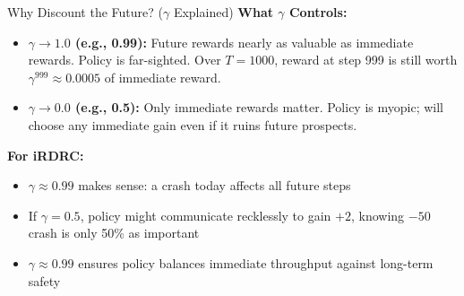 \documentclass{beamer}
\begin{document}
\begin{frame}{Why Discount the Future? ($\gamma$ Explained)}
  \textbf{What $\gamma$ Controls:}

  \begin{itemize}
    \item \textbf{$\gamma \to 1.0$ (e.g., 0.99):} Future rewards nearly as valuable as immediate rewards. Policy is far-sighted. Over $T=1000$, reward at step 999 is still worth $\gamma^{999} \approx 0.0005$ of immediate reward.

    \item \textbf{$\gamma \to 0.0$ (e.g., 0.5):} Only immediate rewards matter. Policy is myopic; will choose any immediate gain even if it ruins future prospects.
  \end{itemize}

  \vspace{0.2cm}
  \textbf{For iRDRC:}
  \begin{itemize}
    \item $\gamma \approx 0.99$ makes sense: a crash today affects all future steps
    \item If $\gamma = 0.5$, policy might communicate recklessly to gain $+2$, knowing $-50$ crash is only 50\% as important
    \item $\gamma \approx 0.99$ ensures policy balances immediate throughput against long-term safety
  \end{itemize}
\end{frame}
\end{document}
